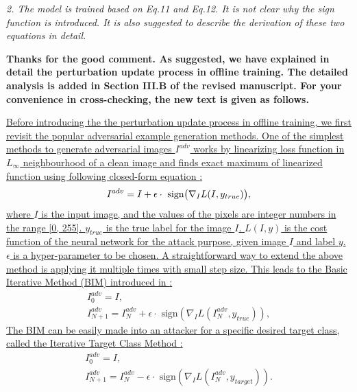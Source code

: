 \documentclass[12pt]{article}
\begin{document}
\textit{2. The model is trained based on Eq.11 and Eq.12. It is not clear why the sign function is introduced. It is also suggested to describe the derivation of these two equations in detail.}

\textbf{Thanks for the good comment. As suggested, we have explained in detail the perturbation update process in offline training.
The detailed analysis is added in Section III.B of the revised manuscript.
For your convenience in cross-checking, the new text is given as follows.}

\uline{Before introducing the the perturbation update process in offline training, we first revisit the popular adversarial example generation methods. One of the simplest methods to generate adversarial images $I^{adv}$ works by linearizing loss function in $L_{\infty}$ neighbourhood of a clean image and finds exact maximum of linearized function using following closed-form equation \cite{FGSM}:}
\begin{equation}
    I^{adv} = I + \epsilon \cdot \text{ sign} \bigl( \nabla_I L(I, y_{true})  \bigr),
    \vspace{-0.1cm}
\end{equation}
\uline{where $I$ is the input image, and the values of the pixels are integer numbers in the range [0, 255]. $y_{true}$ is the true label for the image $I$. $L(I, y)$ is the cost function of the neural network for the attack purpose, given image $I$ and label $y$. $\epsilon$ is a hyper-parameter to be chosen. A straightforward way to extend the above method is applying it multiple times with small step size. This leads to the Basic Iterative Method (BIM) introduced in \cite{kurakin2017adversarial}:}
\begin{equation}
    \begin{gathered}
        I_0^{adv} = I, \\
        I_{N+1}^{adv} = I_N^{adv}+\epsilon \cdot \text{ sign}(\nabla_I L(I_N^{adv},y_{true})),
    \end{gathered}
\end{equation}
\uline{The BIM can be easily made into an attacker for a specific desired target class, called the Iterative Target Class Method \cite{kurakin2017adversarial}:}
\begin{equation}
  \begin{gathered}
      I_0^{adv} = I,\\
      I_{N+1}^{adv} = I_N^{adv}-\epsilon \cdot \text{ sign}(\nabla_I L(I_N^{adv},y_{target})).
  \end{gathered}
  \label{equ:itcm}
\end{equation}
\end{document}
